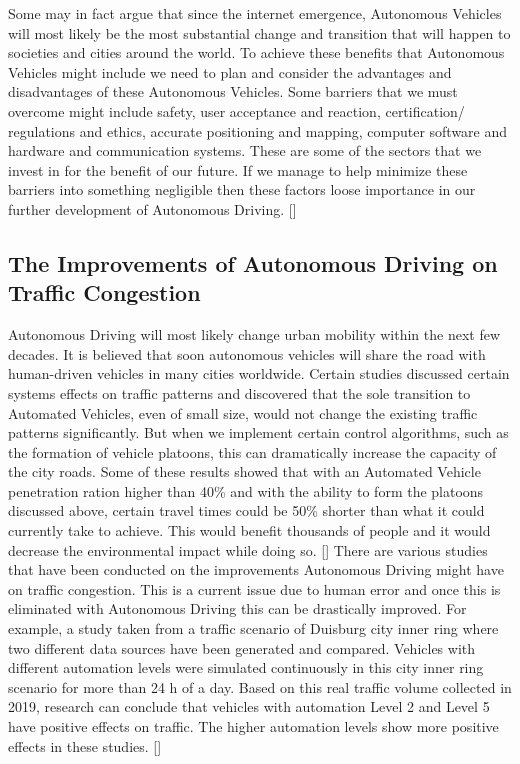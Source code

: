 \documentclass{article}
\begin{document}
Some may in fact argue that since the internet emergence, Autonomous Vehicles will most likely be the most substantial change and transition that will happen to societies and cities around the world. To achieve these benefits that Autonomous Vehicles might include we need to plan and consider the advantages and disadvantages of these Autonomous Vehicles. Some barriers that we must overcome might include safety, user acceptance and reaction, certification/ regulations and ethics, accurate positioning and mapping, computer software and hardware and communication systems. These are some of the sectors that we invest in for the benefit of our future. If we manage to help minimize these barriers into something negligible then these factors loose importance in our further development of Autonomous Driving. [\textcite{bezai2021future}] 

\subsection{The Improvements of Autonomous Driving on Traffic Congestion}

Autonomous Driving will most likely change urban mobility within the next few decades. It is believed that soon autonomous vehicles will share the road with human-driven vehicles in many cities worldwide. Certain studies discussed certain systems effects on traffic patterns and discovered that the sole transition to Automated Vehicles, even of small size, would not change the existing traffic patterns significantly. But when we implement certain control algorithms, such as the formation of vehicle platoons, this can dramatically increase the capacity of the city roads. Some of these results showed that with an Automated Vehicle penetration ration higher than 40\% and with the ability to form the platoons discussed above, certain travel times could be 50\% shorter than what it could currently take to achieve. This would benefit thousands of people and it would decrease the environmental impact while doing so. [\textcite{santana2021transitioning}]
\bigbreak
There are various studies that have been conducted on the improvements Autonomous Driving might have on traffic congestion. This is a current issue due to human error and once this is eliminated with Autonomous Driving this can be drastically improved. For example, a study taken from a traffic scenario of Duisburg city inner ring where two different data sources have been generated and compared. Vehicles with different automation levels were simulated continuously in this city inner ring scenario for more than 24 h of a day. Based on this real traffic volume collected in 2019, research can conclude that vehicles with automation Level 2 and Level 5 have positive effects on traffic. The higher automation levels show more positive effects in these studies.  [\textcite{ma2021traffic}]
\end{document}
